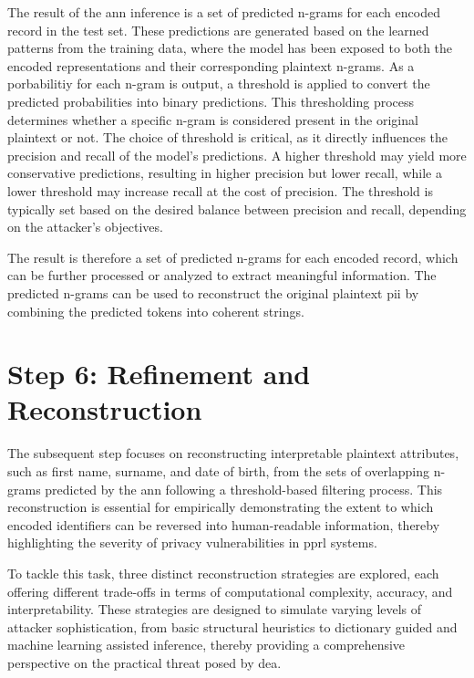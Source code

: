 The result of the \ac{ann} inference is a set of predicted n-grams for each encoded record in the test set.
These predictions are generated based on the learned patterns from the training data, where the model has been exposed to both the encoded representations and their corresponding plaintext n-grams.
As a porbabilitiy for each n-gram is output, a threshold is applied to convert the predicted probabilities into binary predictions.
This thresholding process determines whether a specific n-gram is considered present in the original plaintext or not.
The choice of threshold is critical, as it directly influences the precision and recall of the model's predictions.
A higher threshold may yield more conservative predictions, resulting in higher precision but lower recall, while a lower threshold may increase recall at the cost of precision.
The threshold is typically set based on the desired balance between precision and recall, depending on the attacker's objectives.

The result is therefore a set of predicted n-grams for each encoded record, which can be further processed or analyzed to extract meaningful information.
The predicted n-grams can be used to reconstruct the original plaintext \ac{pii} by combining the predicted tokens into coherent strings.

\section{Step 6: Refinement and Reconstruction} \label{sec:refinementandreconstruction}

The subsequent step focuses on reconstructing interpretable plaintext attributes, such as first name, surname, and date of birth, from the sets of overlapping n-grams predicted by the \ac{ann} following a threshold-based filtering process.
This reconstruction is essential for empirically demonstrating the extent to which encoded identifiers can be reversed into human-readable information, thereby highlighting the severity of privacy vulnerabilities in \ac{pprl} systems.

To tackle this task, three distinct reconstruction strategies are explored, each offering different trade-offs in terms of computational complexity, accuracy, and interpretability.
These strategies are designed to simulate varying levels of attacker sophistication, from basic structural heuristics to dictionary guided and machine learning assisted inference, thereby providing a comprehensive perspective on the practical threat posed by \ac{dea}.

